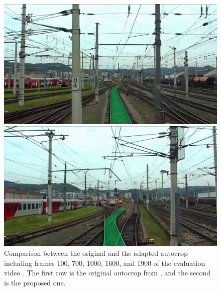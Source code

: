 \begin{figure}[H]
\begin{minipage}{0.195\textwidth}
    \end{minipage}
    \hfill
    \begin{minipage}{0.195\textwidth}
        \includegraphics[width=\textwidth]{PICs/experiments/autocropExperiments/output_frames_improved/frame_1600.png}
    \end{minipage}
    \hfill
    \begin{minipage}{0.195\textwidth}
        \includegraphics[width=\textwidth]{PICs/experiments/autocropExperiments/output_frames_improved/frame_1900.png}
    \end{minipage}

    \begin{minipage}{1.0\textwidth}
        \centering
    \end{minipage}

    \vspace{0.5cm}
    \caption{Comparison between the original and the adapted autocrop including frames 100, 700, 1000, 1600, and 1900 of the evaluation video \cite{temporalDataset_youtube_video}.
    The first row is the original autocrop from \cite{tepNet2024}, and the second is the proposed one.}
    \label{fig:autocropVideoComparison}
\end{figure}

